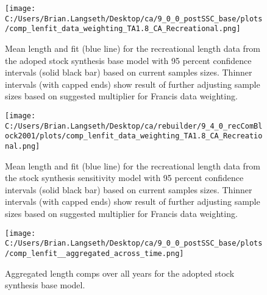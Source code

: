 \documentclass[11pt,
  english,
  a4paper,
]{article}
\begin{document}
\begin{figure}
\centering
\texttt{[image: C:/Users/Brian.Langseth/Desktop/ca/9\_0\_0\_postSSC\_base/plots/comp\_lenfit\_data\_weighting\_TA1.8\_CA\_Recreational.png]}
\caption{Mean length and fit (blue line) for the recreational length data from the adoped stock synthesis base model with 95 percent confidence intervals (solid black bar) based on current samples sizes. Thinner intervals (with capped ends) show result of further adjusting sample sizes based on suggested multiplier for Francis data weighting.\label{fig:MeanLengthFit-rec-base}}
\end{figure}

\tagmcend\tagstructend


\begin{figure}
\centering
\texttt{[image: C:/Users/Brian.Langseth/Desktop/ca/rebuilder/9\_4\_0\_recComBlock2001/plots/comp\_lenfit\_data\_weighting\_TA1.8\_CA\_Recreational.png]}
\caption{Mean length and fit (blue line) for the recreational length data from the stock synthesis sensitivity model with 95 percent confidence intervals (solid black bar) based on current samples sizes. Thinner intervals (with capped ends) show result of further adjusting sample sizes based on suggested multiplier for Francis data weighting.\label{fig:MeanLengthFit-rec-sens}}
\end{figure}

\tagmcend\tagstructend


\begin{figure}
\centering
\texttt{[image: C:/Users/Brian.Langseth/Desktop/ca/9\_0\_0\_postSSC\_base/plots/comp\_lenfit\_\_aggregated\_across\_time.png]}
\caption{Aggregated length comps over all years for the adopted stock synthesis base model.\label{fig:aggLenFit-base}}
\end{figure}
\end{document}
